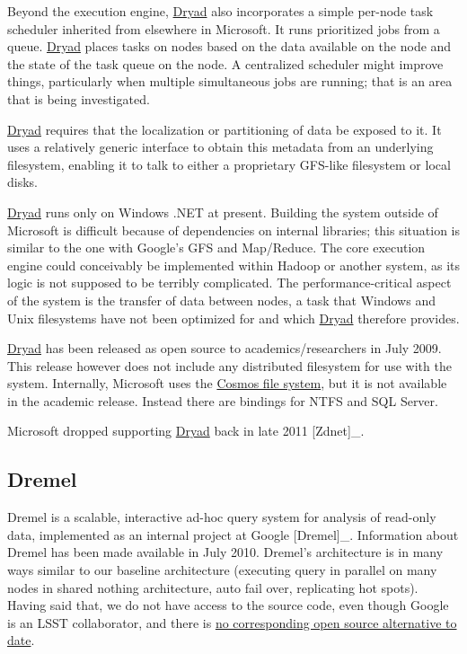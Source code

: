 \documentclass[DM,lsstdraft,toc]{lsstdoc}
\begin{document}
Beyond the execution engine,
\href{http://research.microsoft.com/en-us/projects/dryad/}{Dryad} also
incorporates a simple per-node task scheduler inherited from elsewhere
in Microsoft. It runs prioritized jobs from a queue.
\href{http://research.microsoft.com/en-us/projects/dryad/}{Dryad} places
tasks on nodes based on the data available on the node and the state of
the task queue on the node. A centralized scheduler might improve
things, particularly when multiple simultaneous jobs are running; that
is an area that is being investigated.

\href{http://research.microsoft.com/en-us/projects/dryad/}{Dryad}
requires that the localization or partitioning of data be exposed to it.
It uses a relatively generic interface to obtain this metadata from an
underlying filesystem, enabling it to talk to either a proprietary
GFS-like filesystem or local disks.

\href{http://research.microsoft.com/en-us/projects/dryad/}{Dryad} runs
only on Windows .NET at present. Building the system outside of
Microsoft is difficult because of dependencies on internal libraries;
this situation is similar to the one with Google's GFS and Map/Reduce.
The core execution engine could conceivably be implemented within Hadoop
or another system, as its logic is not supposed to be terribly
complicated. The performance-critical aspect of the system is the
transfer of data between nodes, a task that Windows and Unix filesystems
have not been optimized for and which
\href{http://research.microsoft.com/en-us/projects/dryad/}{Dryad}
therefore provides.

\href{http://research.microsoft.com/en-us/projects/dryad/}{Dryad} has
been released as open source to academics/researchers in July 2009. This
release however does not include any distributed filesystem for use with
the system. Internally, Microsoft uses the
\href{http://www.goland.org/whatiscosmos/}{Cosmos file system}, but it
is not available in the academic release. Instead there are bindings for
NTFS and SQL Server.

Microsoft dropped supporting
\href{http://research.microsoft.com/en-us/projects/dryad/}{Dryad} back
in late 2011 {[}Zdnet{]}\_.

\subsection{Dremel}\label{dremel}

Dremel is a scalable, interactive ad-hoc query system for analysis of
read-only data, implemented as an internal project at Google
{[}Dremel{]}\_. Information about Dremel has been made available in July
2010. Dremel's architecture is in many ways similar to our baseline
architecture (executing query in parallel on many nodes in shared
nothing architecture, auto fail over, replicating hot spots). Having
said that, we do not have access to the source code, even though Google
is an LSST collaborator, and there is
\href{http://www.quora.com/How-will-Dremel-change-future-Hadoop-releases}{no
corresponding open source alternative to date}.
\end{document}
